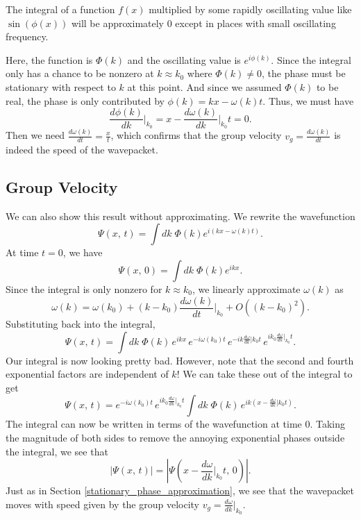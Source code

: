 \begin{framedthm}\label{principle_stationary_phase}
    The integral of a function $f(x)$ multiplied by some rapidly oscillating value like $\sin(\phi(x))$ will be approximately 0 except in places with small oscillating frequency. 
\end{framedthm}

Here, the function is $\Phi(k)$ and the oscillating value is $e^{i\phi(k)}$. Since the integral only has a chance to be nonzero at $k\approx k_0$ where $\Phi(k)\neq 0$, the phase must be stationary with respect to $k$ at this point. And since we assumed $\Phi(k)$ to be real, the phase is only contributed by $\phi(k)=kx-\omega(k)t$. Thus, we must have $$\frac{d\phi(k)}{dk}\bigg|_{k_0}=x-\frac{d\omega(k)}{dk}\bigg|_{k_0}t=0.$$Then we need $\frac{d\omega(k)}{dt}=\frac{x}{t}$, which confirms that the group velocity $v_g=\frac{d\omega(k)}{dt}$ is indeed the speed of the wavepacket.

\subsection{Group Velocity}\label{group_velocity}

We can also show this result without approximating. We rewrite the wavefunction $$\Psi(x,\,t)=\int dk\;\Phi(k)e^{i(kx-\omega(k) t)}.$$At time $t=0$, we have $$\Psi(x,\,0)=\int dk\;\Phi(k)e^{ikx}.$$Since the integral is only nonzero for $k\approx k_0$, we linearly approximate $\omega(k)$ as $$\omega(k)= \omega(k_0)+ (k-k_0)\frac{d\omega(k)}{dt}\bigg|_{k_0}+O((k-k_0)^2).$$Substituting back into the integral, $$\Psi(x,\,t)=\int dk\;\Phi(k)\,e^{ikx}\,e^{-i\omega(k_0) t}\,e^{-ik\frac{d\omega}{dk}|{k_0}t}\,e^{ik_0\frac{d\omega}{dk}|_{k_0}t}.$$ Our integral is now looking pretty bad. However, note that the second and fourth exponential factors are independent of $k$! We can take these out of the integral to get $$\Psi(x,\,t)=e^{-i\omega(k_0) t}\,e^{ik_0\frac{d\omega}{dk}|_{k_0}t}\int dk\;\Phi(k)\,e^{ik(x-\frac{d\omega}{dk}|{k_0}t)}.$$The integral can now be written in terms of the wavefunction at time 0. Taking the magnitude of both sides to remove the annoying exponential phases outside the integral, we see that $$|\Psi(x,\,t)|=|\Psi(x-\frac{d\omega}{dk}\bigg|_{k_0}t,\,0)|.$$Just as in Section \ref{stationary_phase_approximation}, we see that the wavepacket moves with speed given by the group velocity $v_g= \frac{d\omega}{dk}|_{k_0}$.
